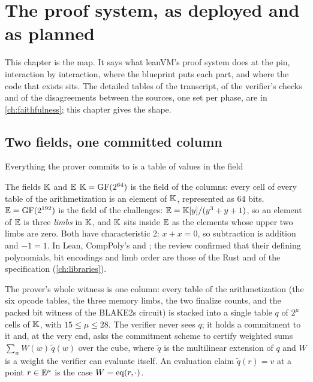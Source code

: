 \chapter[The proof system, as deployed and planned]{The proof system, as deployed and as planned}\label{ch:map}

This chapter is the map. It says what leanVM's proof system does at the pin, interaction by
interaction, where the blueprint puts each part, and where the code that exists sits. The
detailed tables of the transcript, of the verifier's checks and of the disagreements between
the sources, one set per phase, are in \cref{ch:faithfulness}; this chapter gives the shape.

\section{Two fields, one committed column}\label{sec:map-fields}

Everything the prover commits to is a table of values in the field
\begin{define}{The fields $\mathbb{K}$ and $\mathbb{E}$}
$\mathbb{K} = \mathrm{GF}(2^{64})$ is the field of the columns: every cell of every table of the
arithmetization is an element of $\mathbb{K}$, represented as 64 bits. $\mathbb{E} = \mathrm{GF}(2^{192})$ is
the field of the challenges: $\mathbb{E} = \mathbb{K}[y]/(y^3 + y + 1)$, so an element of $\mathbb{E}$ is three
\emph{limbs} in $\mathbb{K}$, and $\mathbb{K}$ sits inside $\mathbb{E}$ as the elements whose upper two limbs are zero.
Both have characteristic 2: $x + x = 0$, so subtraction is addition and $-1 = 1$. In Lean,
CompPoly's  and ; the review confirmed that their defining
polynomials, bit encodings and limb order are those of the Rust and of the specification
(\cref{ch:libraries}).
\end{define}
The prover's whole witness is one column: every table of the arithmetization (the six opcode
tables, the three memory limbs, the two finalize counts, and the packed bit witness of the
BLAKE2s circuit) is stacked into a single table $q$ of $2^{\mu}$ cells of $\mathbb{K}$, with
$15 \le \mu \le 28$. The verifier never sees $q$; it holds a commitment to it and, at the very
end, asks the commitment scheme to certify weighted sums $\sum_w W(w)\, \widetilde{q}(w)$ over
the cube, where $\widetilde{q}$ is the multilinear extension of $q$ and $W$ is a weight the
verifier can evaluate itself. An evaluation claim $\widetilde{q}(r) = v$ at a point
$r \in \mathbb{E}^{\mu}$ is the case $W = \mathrm{eq}(r, \cdot)$.



